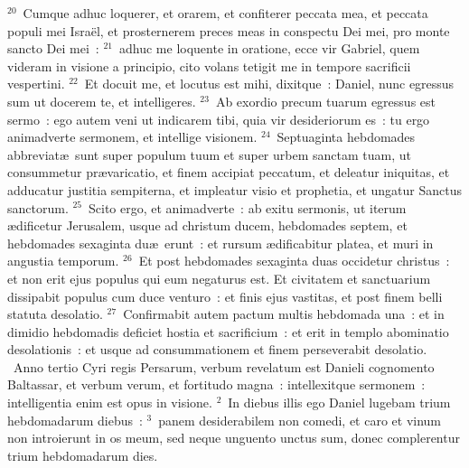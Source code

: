 ${}^{20}$~Cumque adhuc loquerer, et orarem, et confiterer peccata mea, et peccata populi mei Isra\"el, et prosternerem preces meas in conspectu Dei mei, pro monte sancto Dei mei~:
${}^{21}$~adhuc me loquente in oratione, ecce vir Gabriel, quem videram in visione a principio, cito volans tetigit me in tempore sacrificii vespertini.
${}^{22}$~Et docuit me, et locutus est mihi, dixitque~: Daniel, nunc egressus sum ut docerem te, et intelligeres.
${}^{23}$~Ab exordio precum tuarum egressus est sermo~: ego autem veni ut indicarem tibi, quia vir desideriorum es~: tu ergo animadverte sermonem, et intellige visionem.
${}^{24}$~Septuaginta hebdomades abbreviat\ae\ sunt super populum tuum et super urbem sanctam tuam, ut consummetur pr\ae varicatio, et finem accipiat peccatum, et deleatur iniquitas, et adducatur justitia sempiterna, et impleatur visio et prophetia, et ungatur Sanctus sanctorum.
${}^{25}$~Scito ergo, et animadverte~: ab exitu sermonis, ut iterum \ae dificetur Jerusalem, usque ad christum ducem, hebdomades septem, et hebdomades sexaginta du\ae\ erunt~: et rursum \ae dificabitur platea, et muri in angustia temporum.
${}^{26}$~Et post hebdomades sexaginta duas occidetur christus~: et non erit ejus populus qui eum negaturus est. Et civitatem et sanctuarium dissipabit populus cum duce venturo~: et finis ejus vastitas, et post finem belli statuta desolatio.
${}^{27}$~Confirmabit autem pactum multis hebdomada una~: et in dimidio hebdomadis deficiet hostia et sacrificium~: et erit in templo abominatio desolationis~: et usque ad consummationem et finem perseverabit desolatio.
~Anno tertio Cyri regis Persarum, verbum revelatum est Danieli cognomento Baltassar, et verbum verum, et fortitudo magna~: intellexitque sermonem~: intelligentia enim est opus in visione.
${}^{2}$~In diebus illis ego Daniel lugebam trium hebdomadarum diebus~:
${}^{3}$~panem desiderabilem non comedi, et caro et vinum non introierunt in os meum, sed neque unguento unctus sum, donec complerentur trium hebdomadarum dies.


